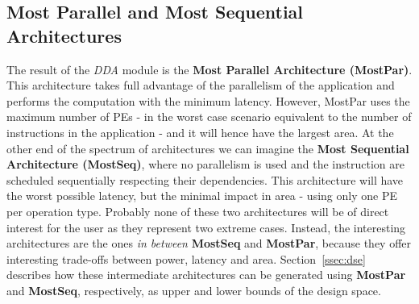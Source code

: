 \subsection{Most Parallel and Most Sequential Architectures}
\vspace{-1mm}
The result of the \textit{DDA} module is the \textbf{Most Parallel Architecture (MostPar)}. This architecture takes full advantage of the parallelism of the application and performs the computation with the minimum latency. However, MostPar uses the maximum number of PEs - in the worst case scenario equivalent to the number of instructions in the application - and it will hence have the largest area.
At the other end of the spectrum of architectures we can imagine the \textbf{Most Sequential Architecture (MostSeq)}, where no parallelism is used and the instruction are scheduled sequentially respecting their dependencies. This architecture will have the worst possible latency, but the minimal impact in area - using only one PE per operation type.
Probably none of these two architectures will be of direct interest for the user as they represent two extreme cases. Instead, the interesting architectures are the ones \textit{in between} \textbf{MostSeq} and \textbf{MostPar}, because they offer interesting trade-offs between power, latency and area. Section~\ref{ssec:dse} describes how these intermediate architectures can be generated using \textbf{MostPar} and \textbf{MostSeq}, respectively, as upper and lower bounds of the design space.

\vspace{-1mm}
